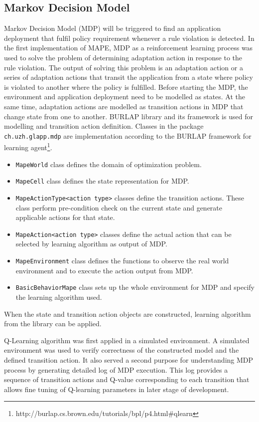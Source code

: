 \documentclass{seal_thesis}
\begin{document}
\subsection{Markov Decision Model}\label{sec:mdp}
Markov Decision Model (MDP) will be triggered to find an application deployment that fulfil policy requirement whenever a rule violation is detected.
In the first implementation of MAPE, MDP as a reinforcement learning process was used to solve the problem of determining adaptation action in response to the rule violation.
The output of solving this problem is an adaptation action or a series of adaptation actions that transit the application from a state where policy is violated to another where the policy is fulfilled.
Before starting the MDP, the environment and application deployment need to be modelled as states.
At the same time, adaptation actions are modelled as transition actions in MDP that change state from one to another.
BURLAP library and its framework is used for modelling and transition action definition.
Classes in the package \texttt{ch.uzh.glapp.mdp} are implementation according to the BURLAP framework for learning agent\footnote{http://burlap.cs.brown.edu/tutorials/bpl/p4.html\#qlearn}.
\begin{itemize}
\item \texttt{MapeWorld} class defines the domain of optimization problem.
\item \texttt{MapeCell} class defines the state representation for MDP.
\item \texttt{MapeActionType<action type>} classes define the transition actions.
These class perform pre-condition check on the current state and generate applicable actions for that state.
\item \texttt{MapeAction<action type>} classes define the actual action that can be selected by learning algorithm as output of MDP.
\item \texttt{MapeEnvironment} class defines the functions to observe the real world environment and to execute the action output from MDP.
\item \texttt{BasicBehaviorMape} class sets up the whole environment for MDP and specify the learning algorithm used.
\end{itemize}
When the state and transition action objects are constructed, learning algorithm from the library can be applied.

Q-Learning algorithm was first applied in a simulated environment.
A simulated environment was used to verify correctness of the constructed model and the defined transition action.
It also served a second purpose for understanding MDP process by generating detailed log of MDP execution.
This log provides a sequence of transition actions and Q-value corresponding to each transition that allows fine tuning of Q-learning parameters in later stage of development.
\end{document}
